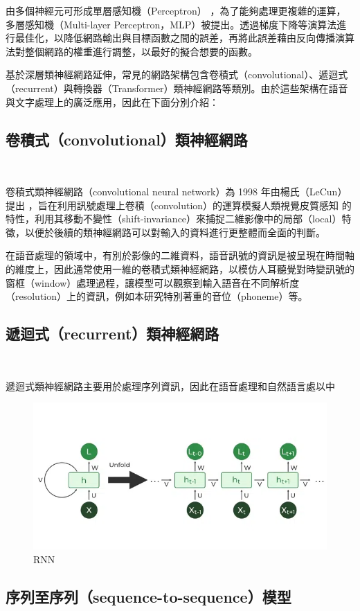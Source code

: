 由多個神經元可形成單層感知機（Perceptron） \cite{rosenblatt1958perceptron}，為了能夠處理更複雜的運算，多層感知機（Multi-layer Perceptron，MLP）被提出。透過梯度下降等演算法進行最佳化，以降低網路輸出與目標函數之間的誤差，再將此誤差藉由反向傳播演算法對整個網路的權重進行調整，以最好的擬合想要的函數。

基於深層類神經網路延伸，常見的網路架構包含卷積式（convolutional）、遞迴式（recurrent）與轉換器（Transformer）類神經網路等類別。由於這些架構在語音與文字處理上的廣泛應用，因此在下面分別介紹：

\subsection{卷積式（convolutional）類神經網路}　　

卷積式類神經網路（convolutional neural network）為 1998 年由楊氏（LeCun）提出 \cite{726791}，旨在利用訊號處理上卷積（convolution）的運算模擬人類視覺皮質感知 \cite{hubel1959receptive} 的特性，利用其移動不變性（shift-invariance）來捕捉二維影像中的局部（local）特徵，以便於後續的類神經網路可以對輸入的資料進行更整體而全面的判斷。

在語音處理的領域中，有別於影像的二維資料，語音訊號的資訊是被呈現在時間軸的維度上，因此通常使用一維的卷積式類神經網路，以模仿人耳聽覺對時變訊號的窗框（window）處理過程，讓模型可以觀察到輸入語音在不同解析度（resolution）上的資訊，例如本研究特別著重的音位（phoneme）等。


\subsection{遞迴式（recurrent）類神經網路}　　

遞迴式類神經網路主要用於處理序列資訊，因此在語音處理和自然語言處以中

\begin{figure}
    \centering
    \includegraphics[width=0.5\linewidth]{figures/image.png}
    \caption{RNN}
    \label{fig:RNN}
\end{figure}

\subsection{序列至序列（sequence-to-sequence）模型}　　


